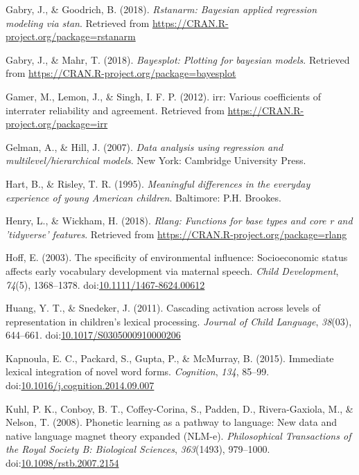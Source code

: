 \documentclass [11pt, proquest] {uwthesis}[2015/03/03]
\begin{document}
\hypertarget{ref-R-rstanarm}{}
Gabry, J., \& Goodrich, B. (2018). \emph{Rstanarm: Bayesian applied
regression modeling via stan}. Retrieved from
\url{https://CRAN.R-project.org/package=rstanarm}

\hypertarget{ref-R-bayesplot}{}
Gabry, J., \& Mahr, T. (2018). \emph{Bayesplot: Plotting for bayesian
models}. Retrieved from
\url{https://CRAN.R-project.org/package=bayesplot}

\hypertarget{ref-irr}{}
Gamer, M., Lemon, J., \& Singh, I. F. P. (2012). irr: Various
coefficients of interrater reliability and agreement. Retrieved from
\url{https://CRAN.R-project.org/package=irr}

\hypertarget{ref-GelmanHill}{}
Gelman, A., \& Hill, J. (2007). \emph{Data analysis using regression and
multilevel/hierarchical models}. New York: Cambridge University Press.

\hypertarget{ref-HartRisley}{}
Hart, B., \& Risley, T. R. (1995). \emph{Meaningful differences in the
everyday experience of young American children}. Baltimore: P.H.
Brookes.

\hypertarget{ref-R-rlang}{}
Henry, L., \& Wickham, H. (2018). \emph{Rlang: Functions for base types
and core r and 'tidyverse' features}. Retrieved from
\url{https://CRAN.R-project.org/package=rlang}

\hypertarget{ref-Hoff2003}{}
Hoff, E. (2003). The specificity of environmental influence:
Socioeconomic status affects early vocabulary development via maternal
speech. \emph{Child Development}, \emph{74}(5), 1368--1378.
doi:\href{https://doi.org/10.1111/1467-8624.00612}{10.1111/1467-8624.00612}

\hypertarget{ref-Huang2011}{}
Huang, Y. T., \& Snedeker, J. (2011). Cascading activation across levels
of representation in children's lexical processing. \emph{Journal of
Child Language}, \emph{38}(03), 644--661.
doi:\href{https://doi.org/10.1017/S0305000910000206}{10.1017/S0305000910000206}

\hypertarget{ref-Kapnoula2015}{}
Kapnoula, E. C., Packard, S., Gupta, P., \& McMurray, B. (2015).
Immediate lexical integration of novel word forms. \emph{Cognition},
\emph{134}, 85--99.
doi:\href{https://doi.org/10.1016/j.cognition.2014.09.007}{10.1016/j.cognition.2014.09.007}

\hypertarget{ref-Kuhl2008}{}
Kuhl, P. K., Conboy, B. T., Coffey-Corina, S., Padden, D.,
Rivera-Gaxiola, M., \& Nelson, T. (2008). Phonetic learning as a pathway
to language: New data and native language magnet theory expanded
(NLM-e). \emph{Philosophical Transactions of the Royal Society B:
Biological Sciences}, \emph{363}(1493), 979--1000.
doi:\href{https://doi.org/10.1098/rstb.2007.2154}{10.1098/rstb.2007.2154}
\end{document}
